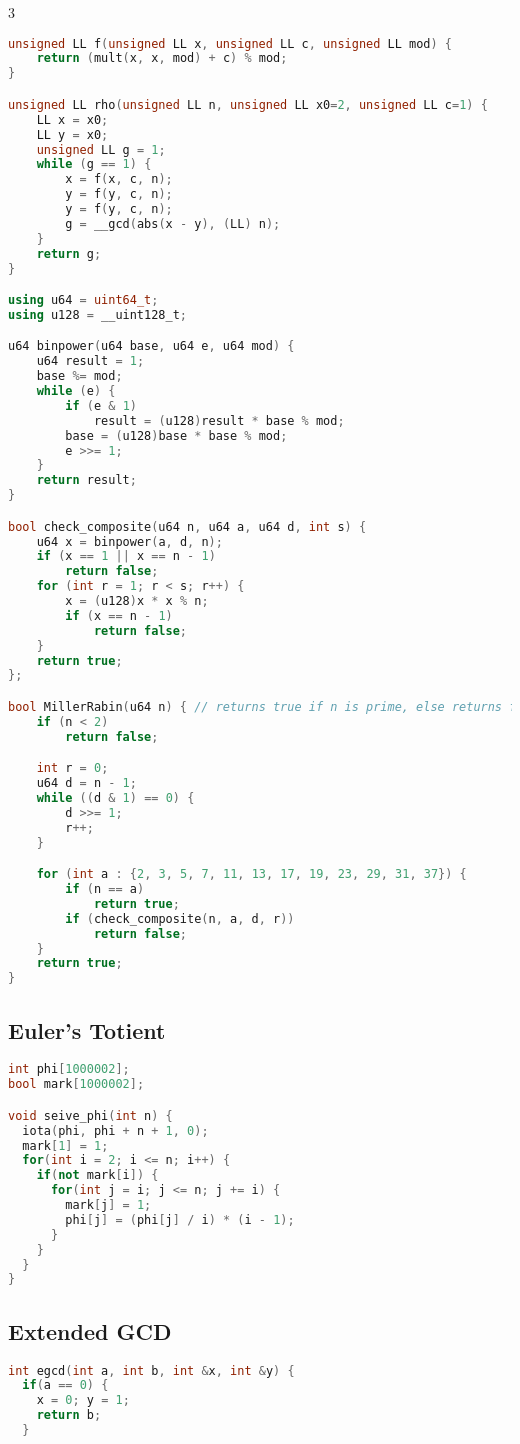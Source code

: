 \documentclass[10pt,a4paper,landscape]{article}
\begin{document}
\begin{multicols}{3}
\begin{lstlisting}[language=C++,breaklines=true]
unsigned LL f(unsigned LL x, unsigned LL c, unsigned LL mod) {
    return (mult(x, x, mod) + c) % mod;
}

unsigned LL rho(unsigned LL n, unsigned LL x0=2, unsigned LL c=1) {
    LL x = x0;
    LL y = x0;
    unsigned LL g = 1;
    while (g == 1) {
        x = f(x, c, n);
        y = f(y, c, n);
        y = f(y, c, n);
        g = __gcd(abs(x - y), (LL) n);
    }
    return g;
}

using u64 = uint64_t;
using u128 = __uint128_t;

u64 binpower(u64 base, u64 e, u64 mod) {
    u64 result = 1;
    base %= mod;
    while (e) {
        if (e & 1)
            result = (u128)result * base % mod;
        base = (u128)base * base % mod;
        e >>= 1;
    }
    return result;
}

bool check_composite(u64 n, u64 a, u64 d, int s) {
    u64 x = binpower(a, d, n);
    if (x == 1 || x == n - 1)
        return false;
    for (int r = 1; r < s; r++) {
        x = (u128)x * x % n;
        if (x == n - 1)
            return false;
    }
    return true;
};

bool MillerRabin(u64 n) { // returns true if n is prime, else returns false.
    if (n < 2)
        return false;

    int r = 0;
    u64 d = n - 1;
    while ((d & 1) == 0) {
        d >>= 1;
        r++;
    }

    for (int a : {2, 3, 5, 7, 11, 13, 17, 19, 23, 29, 31, 37}) {
        if (n == a)
            return true;
        if (check_composite(n, a, d, r))
            return false;
    }
    return true;
}
\end{lstlisting}

\subsection{Euler's Totient}
\begin{lstlisting}[language=C++, breaklines=true]
int phi[1000002];
bool mark[1000002];

void seive_phi(int n) {
  iota(phi, phi + n + 1, 0);
  mark[1] = 1;
  for(int i = 2; i <= n; i++) {
    if(not mark[i]) {
      for(int j = i; j <= n; j += i) {
        mark[j] = 1;
        phi[j] = (phi[j] / i) * (i - 1);
      }
    }
  }
}
\end{lstlisting}

\subsection{Extended GCD}
\begin{lstlisting}[language=C++, breaklines=true]
int egcd(int a, int b, int &x, int &y) {
  if(a == 0) {
    x = 0; y = 1;
    return b;
  }


\end{lstlisting}
\end{multicols}
\end{document}

